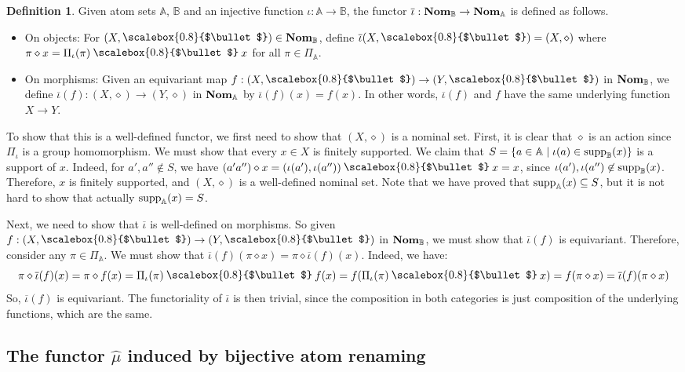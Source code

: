 \documentclass[11pt,a4paper]{amsart}
\theoremstyle{plain}
\theoremstyle{definition}
\newtheorem{xdefinition}[xtheorem]{Definition}
\theoremstyle{remark}
\newcommand{\PI}{\Pi}
\newcommand{\PIA}{\PI_{\aA}}
\newcommand{\Nom}{\textrm{\bf Nom}}
\newcommand{\NomX}[1]{\Nom_{#1}}
\newcommand{\NomA}{\NomX{\aA}}
\newcommand{\NomB}{\NomX{\bB}}
\newcommand{\aA}{\mathbb{A}}
\newcommand{\bB}{\mathbb{B}}
\newcommand{\supp}{\mathop{\text{\rm supp}}}
\newcommand{\set}[1]{\{#1\}}
\newcommand{\muhat}{\widehat{\mu}}
\let\oldbullet\bullet
\newcommand{\action}{\mathbin{\text{\raisebox{0.15ex}{\scalebox{0.8}{$\oldbullet$}}}}}
\newcommand{\bul}{\action}
\begin{document}
\begin{xdefinition}
  Given atom sets $\aA$, $\bB$ and an injective function
  $\iota:\aA\to\bB$, the functor $\overline{\iota}:\NomB\to\NomA$ is defined
  as follows.

\begin{itemize}
\item{} On objects: For $(X,\bul)\in\NomB$, define
  $\overline{\iota}(X,\bul)=(X,\diamond)$ where $\pi\diamond x=
  \PI_\iota(\pi)\bul x$ for all $\pi\in \PIA$.
\item{} On morphisms: Given an equivariant map $f:(X,\bul) \to
  (Y,\bul)$ in $\NomB$, we define $\overline{\iota}(f):(X,\diamond)\to
  (Y,\diamond)$ in $\NomA$ by $\overline{\iota}(f)(x)=f(x)$. In other
  words, $\overline{\iota}(f)$ and $f$ have the same underlying function
  $X\to Y$.
\end{itemize}

To show that this is a well-defined functor, we first need to show
that $(X,\diamond)$ is a nominal set. First, it is clear that
$\diamond$ is an action since $\PI_{\iota}$ is a group homomorphism. We
must show that every $x\in X$ is finitely supported. We claim that
$S=\set{a\in \aA \mid \iota(a)\in \supp_{\bB}(x)}$ is a support of $x$.
Indeed, for $a',a''\not\in S$, we have $(a'a'')\diamond x =
(\iota(a'),\iota(a''))\bul x =x$, since $\iota(a'),\iota(a'')\not\in \supp_\bB(x)$.
Therefore, $x$ is finitely supported, and $(X,\diamond)$ is a
well-defined nominal set.  Note that we have proved that
$\supp_{\aA}(x)\subseteq S$, but it is not hard to show that actually
$\supp_{\aA}(x)=S$.

Next, we need to show that $\overline{\iota}$ is well-defined on
morphisms. So given $f:(X,\bul) \to (Y,\bul)$ in $\NomB$, we
must show that $\overline{\iota}(f)$ is equivariant. Therefore, consider
any $\pi \in \PIA$. We must show that
$\overline{\iota}(f)(\pi\diamond x) = \pi \diamond \overline{\iota}(f)(x)$.
Indeed, we have:
\[
\pi \diamond \overline{\iota}(f)(x) = \pi \diamond f(x)
 =  \PI_\iota(\pi) \bul f(x)
 =  f(\PI_\iota(\pi) \bul x)
 =  f(\pi \diamond x)
 =  \overline{\iota} (f)(\pi \diamond x)
\]
So, $\overline{\iota}(f)$ is equivariant. The functoriality of
$\overline{\iota}$ is then trivial, since the composition in both
categories is just composition of the underlying functions, which are
the same.
\end{xdefinition}

\subsection{The functor \texorpdfstring{$\muhat$}{μ} induced by bijective atom renaming}
\label{ssec:muhat-bijective}
\end{document}

